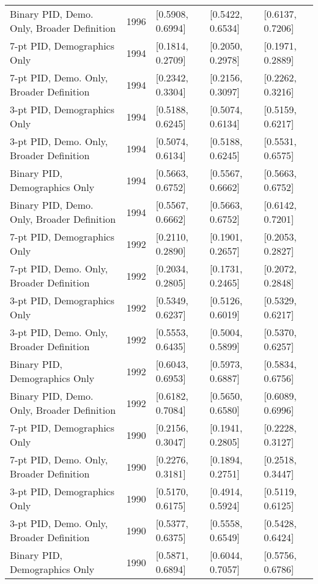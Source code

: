 \begin{longtable}{lrlll}
  Binary PID, Demo. Only, Broader Definition & 1996 & [0.5908, 0.6994] & [0.5422, 0.6534] & [0.6137, 0.7206] \\ 
  7-pt PID, Demographics Only & 1994 & [0.1814, 0.2709] & [0.2050, 0.2978] & [0.1971, 0.2889] \\ 
  7-pt PID, Demo. Only, Broader Definition & 1994 & [0.2342, 0.3304] & [0.2156, 0.3097] & [0.2262, 0.3216] \\ 
  3-pt PID, Demographics Only & 1994 & [0.5188, 0.6245] & [0.5074, 0.6134] & [0.5159, 0.6217] \\ 
  3-pt PID, Demo. Only, Broader Definition & 1994 & [0.5074, 0.6134] & [0.5188, 0.6245] & [0.5531, 0.6575] \\ 
  Binary PID, Demographics Only & 1994 & [0.5663, 0.6752] & [0.5567, 0.6662] & [0.5663, 0.6752] \\ 
  Binary PID, Demo. Only, Broader Definition & 1994 & [0.5567, 0.6662] & [0.5663, 0.6752] & [0.6142, 0.7201] \\ 
  7-pt PID, Demographics Only & 1992 & [0.2110, 0.2890] & [0.1901, 0.2657] & [0.2053, 0.2827] \\ 
  7-pt PID, Demo. Only, Broader Definition & 1992 & [0.2034, 0.2805] & [0.1731, 0.2465] & [0.2072, 0.2848] \\ 
  3-pt PID, Demographics Only & 1992 & [0.5349, 0.6237] & [0.5126, 0.6019] & [0.5329, 0.6217] \\ 
  3-pt PID, Demo. Only, Broader Definition & 1992 & [0.5553, 0.6435] & [0.5004, 0.5899] & [0.5370, 0.6257] \\ 
  Binary PID, Demographics Only & 1992 & [0.6043, 0.6953] & [0.5973, 0.6887] & [0.5834, 0.6756] \\ 
  Binary PID, Demo. Only, Broader Definition & 1992 & [0.6182, 0.7084] & [0.5650, 0.6580] & [0.6089, 0.6996] \\ 
  7-pt PID, Demographics Only & 1990 & [0.2156, 0.3047] & [0.1941, 0.2805] & [0.2228, 0.3127] \\ 
  7-pt PID, Demo. Only, Broader Definition & 1990 & [0.2276, 0.3181] & [0.1894, 0.2751] & [0.2518, 0.3447] \\ 
  3-pt PID, Demographics Only & 1990 & [0.5170, 0.6175] & [0.4914, 0.5924] & [0.5119, 0.6125] \\ 
  3-pt PID, Demo. Only, Broader Definition & 1990 & [0.5377, 0.6375] & [0.5558, 0.6549] & [0.5428, 0.6424] \\ 
  Binary PID, Demographics Only & 1990 & [0.5871, 0.6894] & [0.6044, 0.7057] & [0.5756, 0.6786] \\ 

\end{longtable}
